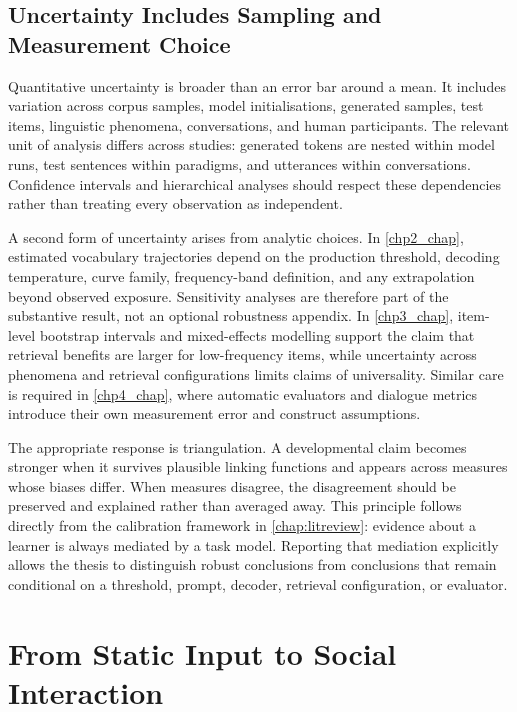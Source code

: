\subsection{Uncertainty Includes Sampling and Measurement Choice}

Quantitative uncertainty is broader than an error bar around a mean. It includes variation across corpus samples, model initialisations, generated samples, test items, linguistic phenomena, conversations, and human participants. The relevant unit of analysis differs across studies: generated tokens are nested within model runs, test sentences within paradigms, and utterances within conversations. Confidence intervals and hierarchical analyses should respect these dependencies rather than treating every observation as independent.

A second form of uncertainty arises from analytic choices. In \cref{chp2_chap}, estimated vocabulary trajectories depend on the production threshold, decoding temperature, curve family, frequency-band definition, and any extrapolation beyond observed exposure. Sensitivity analyses are therefore part of the substantive result, not an optional robustness appendix. In \cref{chp3_chap}, item-level bootstrap intervals and mixed-effects modelling support the claim that retrieval benefits are larger for low-frequency items, while uncertainty across phenomena and retrieval configurations limits claims of universality. Similar care is required in \cref{chp4_chap}, where automatic evaluators and dialogue metrics introduce their own measurement error and construct assumptions.

The appropriate response is triangulation. A developmental claim becomes stronger when it survives plausible linking functions and appears across measures whose biases differ. When measures disagree, the disagreement should be preserved and explained rather than averaged away. This principle follows directly from the calibration framework in \cref{chap:litreview}: evidence about a learner is always mediated by a task model. Reporting that mediation explicitly allows the thesis to distinguish robust conclusions from conclusions that remain conditional on a threshold, prompt, decoder, retrieval configuration, or evaluator.

\section{From Static Input to Social Interaction}
\label{sec:gd_interaction}

